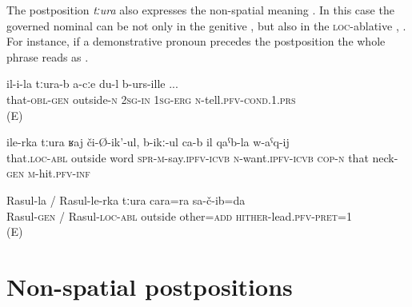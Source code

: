 The postposition \textit{tːura} also expresses the non-spatial meaning . In this case the governed nominal can be not only in the genitive , but also in the \textsc{loc}-ablative , . For instance, if a demonstrative pronoun precedes the postposition the whole phrase reads as .
%
\begin{exe}
	\ex
	\begin{xlist}
		\ex	\label{If I can tell you now (something else) apart from this}
		\gll	il-i-la	tːura-b	a-cːe	du-l	b-urs-ille  ...\\
			that-\textsc{obl}-\textsc{gen}	outside-\textsc{n}	2\textsc{sg}-\textsc{in}	1\textsc{sg}-\textsc{erg}	\textsc{n}-tell.\textsc{pfv}-\textsc{cond}.1.\textsc{prs}\\
		\glt	{} (E)

		\ex	\label{Moreover, he defamed (him) and wanted (him) to be beheaded}
		\gll	ile-rka tːura		ʁaj	či-Ø-ik'-ul,	b-ikː-ul ca-b	il	qaˁb-la	w-aˁq-ij\\
			that.\textsc{loc}-\textsc{abl}	outside	word	\textsc{spr}-\textsc{m}-say.\textsc{ipfv}-\textsc{icvb}	\textsc{n}-want.\textsc{ipfv}-\textsc{icvb} \textsc{cop-n}	that	neck-\textsc{gen}	\textsc{m}-hit.\textsc{pfv}-\textsc{inf}\\
		\glt	{}

		\ex	\label{Apart from Rasul I also brought another one}
		\gll	Rasul-la	/	Rasul-le-rka	tːura	cara=ra	sa-č-ib=da  \\
			Rasul-\textsc{gen}	/ Rasul-\textsc{loc}-\textsc{abl}	outside	other=\textsc{add}	\textsc{hither}-lead.\textsc{pfv}-\textsc{pret}=1\\
		\glt	{} (E)
	\end{xlist}
\end{exe}



\section{Non-spatial postpositions}
\label{sec:Non-spatial postpositions}


